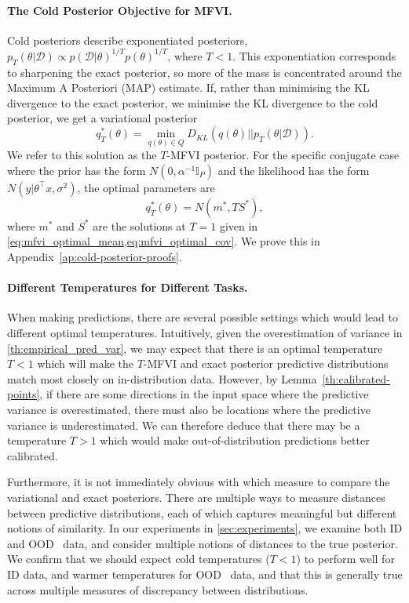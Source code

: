 \documentclass{article}
\theoremstyle{plain}
\theoremstyle{definition}
\theoremstyle{remark}
\theoremstyle{plain}
\newcommand{\I}{\mathbb{I}}
\newcommand{\data}{\mathcal{D}}
\newcommand{\likelihood}{\sigma^2}
\newcommand{\KL}[2]{D_{KL}\left(#1||#2\right)}
\begin{document}
\paragraph{The Cold Posterior Objective for MFVI.}  Cold posteriors describe exponentiated posteriors, $p_T(\theta| \data) \propto p(\data| \theta)^{1/T} p(\theta)^{1/T}$, where $T<1$. This exponentiation corresponds to sharpening the exact posterior, so more of the mass is concentrated around the Maximum A Posteriori (MAP) estimate. If, rather than minimising the KL divergence to the exact posterior, we minimise the KL divergence to the cold posterior, we get a variational posterior 
\begin{equation}
    q_T^*(\theta) = \min_{q(\theta)\in Q} \KL{ q(\theta)}{p_T(\theta|\data)}.
\end{equation}
We refer to this solution as the $T$-MFVI posterior. 
For the specific conjugate case where the prior has the form $N(0, \alpha^{-1} \I_P)$ and the likelihood has the form $N(y|\theta^\top  x, \likelihood) $, the optimal parameters are
\begin{equation}\label{equ:t_mfvi_post}
    q_T^*(\theta) = N(m^*, T S^*),
\end{equation}
where $m^*$ and $S^*$ are the solutions at $T=1$ given in \cref{eq:mfvi_optimal_mean,eq:mfvi_optimal_cov}. We prove this in Appendix~\ref{ap:cold-posterior-proofs}. 

\paragraph{Different Temperatures for Different Tasks.} When making predictions, there are several possible settings which would lead to different optimal temperatures. Intuitively, given the overestimation of variance in \cref{th:empirical_pred_var}, we may expect that there is an optimal temperature $T<1$ which will make the $T$-MFVI and exact posterior predictive distributions match most closely on in-distribution data. However, by Lemma~\ref{th:calibrated-points}, if there are some directions in the input space where the predictive variance is overestimated, there must also be locations where the predictive variance is underestimated. We can therefore deduce that there may be a temperature $T>1$ which would make out-of-distribution predictions better calibrated. 

Furthermore, it is not immediately obvious with which measure to compare the variational and exact posteriors. There are multiple ways to measure distances between predictive distributions, each of which captures meaningful but different notions of similarity. 
In our experiments in \cref{sec:experiments}, we examine both ID and OOD \ data, and consider multiple notions of distances to the true posterior. We confirm that we should expect cold temperatures ($T<1$) to perform well for ID data, and warmer temperatures for OOD \ data, and that this is generally true across multiple measures of discrepancy between distributions. 
\end{document}

